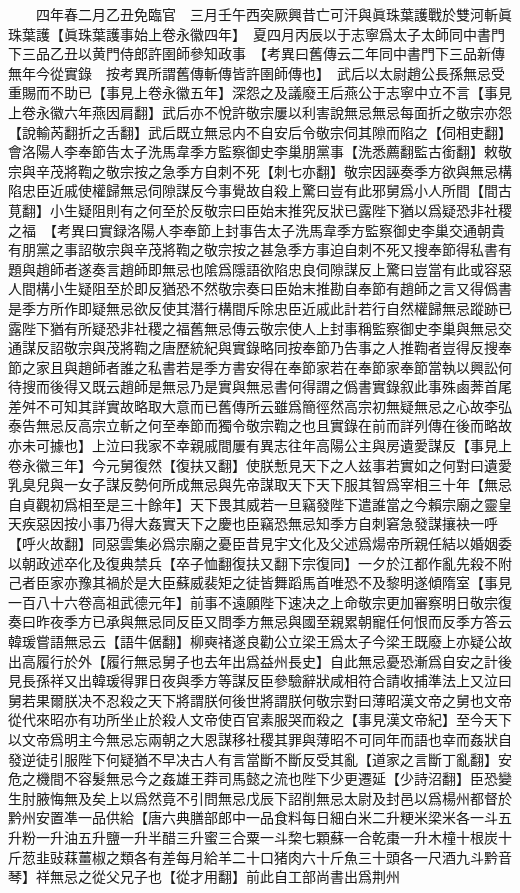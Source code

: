 　　四年春二月乙丑免臨官　三月壬午西突厥興昔亡可汗與眞珠葉護戰於雙河斬眞珠葉護【眞珠葉護事始上卷永徽四年】　夏四月丙辰以于志寧爲太子太師同中書門下三品乙丑以黄門侍郎許圉師參知政事　【考異曰舊傳云二年同中書門下三品新傳無年今從實錄　按考異所謂舊傳斬傳皆許圉師傳也】　武后以太尉趙公長孫無忌受重賜而不助已【事見上卷永徽五年】深怨之及議廢王后燕公于志寧中立不言【事見上卷永徽六年燕因肩翻】武后亦不悅許敬宗屢以利害說無忌無忌每面折之敬宗亦怨【說輸芮翻折之舌翻】武后既立無忌内不自安后令敬宗伺其隙而陷之【伺相吏翻】會洛陽人李奉節告太子洗馬韋季方監察御史李巢朋黨事【洗悉薦翻監古銜翻】敕敬宗與辛茂將鞫之敬宗按之急季方自刺不死【刺七亦翻】敬宗因誣奏季方欲與無忌構陷忠臣近戚使權歸無忌伺隙謀反今事覺故自殺上驚曰豈有此邪舅爲小人所間【間古莧翻】小生疑阻則有之何至於反敬宗曰臣始末推究反狀已露陛下猶以爲疑恐非社稷之福　【考異曰實録洛陽人李奉節上封事告太子洗馬韋季方監察御史李巢交通朝貴有朋黨之事詔敬宗與辛茂將鞫之敬宗按之甚急季方事迫自刺不死又搜奉節得私書有題與趙師者遂奏言趙師即無忌也隂爲隱語欲陷忠良伺隙謀反上驚曰豈當有此或容惡人間構小生疑阻至於即反猶恐不然敬宗奏曰臣始末推勘自奉節有趙師之言又得僞書是季方所作即疑無忌欲反使其潛行構間斥除忠臣近戚此計若行自然權歸無忌蹤跡已露陛下猶有所疑恐非社稷之福舊無忌傳云敬宗使人上封事稱監察御史李巢與無忌交通謀反詔敬宗與茂將鞫之唐歷統紀與實錄略同按奉節乃告事之人推鞫者豈得反搜奉節之家且與趙師者誰之私書若是季方書安得在奉節家若在奉節家奉節當執以興訟何待搜而後得又既云趙師是無忌乃是實與無忌書何得謂之僞書實錄叙此事殊鹵莾首尾差舛不可知其詳實故略取大意而已舊傳所云雖爲簡徑然高宗初無疑無忌之心故李弘泰告無忌反高宗立斬之何至奉節而獨令敬宗鞫之也且實錄在前而詳列傳在後而略故亦未可據也】上泣曰我家不幸親戚間屢有異志往年高陽公主與房遺愛謀反【事見上卷永徽三年】今元舅復然【復扶又翻】使朕慙見天下之人兹事若實如之何對曰遺愛乳臭兒與一女子謀反勢何所成無忌與先帝謀取天下天下服其智爲宰相三十年【無忌自貞觀初爲相至是三十餘年】天下畏其威若一旦竊發陛下遣誰當之今賴宗廟之靈皇天疾惡因按小事乃得大姦實天下之慶也臣竊恐無忌知季方自刺窘急發謀攘袂一呼【呼火故翻】同惡雲集必爲宗廟之憂臣昔見宇文化及父述爲煬帝所親任結以婚姻委以朝政述卒化及復典禁兵【卒子恤翻復扶又翻下宗復同】一夕於江都作亂先殺不附己者臣家亦豫其禍於是大臣蘇威裴矩之徒皆舞蹈馬首唯恐不及黎明遂傾隋室【事見一百八十六卷高祖武德元年】前事不遠願陛下速决之上命敬宗更加審察明日敬宗復奏曰昨夜季方已承與無忌同反臣又問季方無忌與國至親累朝寵任何恨而反季方答云韓瑗嘗語無忌云【語牛倨翻】柳奭禇遂良勸公立梁王爲太子今梁王既廢上亦疑公故出高履行於外【履行無忌舅子也去年出爲益州長史】自此無忌憂恐漸爲自安之計後見長孫祥又出韓瑗得罪日夜與季方等謀反臣參驗辭狀咸相符合請收捕準法上又泣曰舅若果爾朕决不忍殺之天下將謂朕何後世將謂朕何敬宗對曰薄昭漢文帝之舅也文帝從代來昭亦有功所坐止於殺人文帝使百官素服哭而殺之【事見漢文帝紀】至今天下以文帝爲明主今無忌忘兩朝之大恩謀移社稷其罪與薄昭不可同年而語也幸而姦狀自發逆徒引服陛下何疑猶不早决古人有言當斷不斷反受其亂【道家之言斷丁亂翻】安危之機間不容髮無忌今之姦雄王莽司馬懿之流也陛下少更遷延【少詩沼翻】臣恐變生肘腋悔無及矣上以爲然竟不引問無忌戊辰下詔削無忌太尉及封邑以爲楊州都督於黔州安置凖一品供給【唐六典膳部郎中一品食料每日細白米二升粳米梁米各一斗五升粉一升油五升鹽一升半醋三升蜜三合粟一斗棃七顆蘇一合乾棗一升木橦十根炭十斤䓤韭䜴䔉薑椒之類各有差每月給羊二十口猪肉六十斤魚三十頭各一尺酒九斗黔音琴】祥無忌之從父兄子也【從才用翻】前此自工部尚書出爲荆州